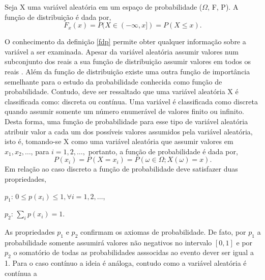   \begin{defin}
	  Seja X uma vari\'{a}vel aleat\'{o}ria
	  em um espa\c{c}o de probabilidade ($\Omega$, F, P). A fun\c{c}\~{a}o de distribui\c{c}\~{a}o \'{e} dada por,
  	\begin{equation*} 
		F_{x} (x) = P( X \in (-\infty, x]) = P(X \leq x). 
	\end{equation*} \label{fdp} 
  \end{defin}
O conhecimento da defini\c c\~ao \ref{fdp} permite obter qualquer informa\c{c}\~{a}o sobre a vari\'{a}vel a ser examinada.
Apesar da vari\'{a}vel aleat\'oria assumir valores num subconjunto dos reais a sua fun\c{c}\~{a}o de
distribui\c{c}\~{a}o assumir valores em todos os reais \cite{magalhaes}. Al\'{e}m da fun\c{c}\~{a}o de
distribui\c{c}\~{a}o existe uma outra fun\c{c}\~{a}o de import\^ancia semelhante para o estudo da
probabilidade conhecida como fun\c{c}\~{a}o de probabilidade.  Contudo, deve ser ressaltado que uma
vari\'{a}vel aleat\'{o}ria X \'{e} classificada como: discreta ou cont\'{i}nua. Uma vari\'{a}vel \'{e}
classificada como discreta quando assumir somente um n\'{u}mero enumer\'{a}vel de valores finito ou infinito.
Desta forma, uma fun\c c\~ao de probabilidade para esse tipo de vari\'avel aleat\'oria 
atribuir valor a cada um dos poss\'{i}veis valores assumidos pela vari\'{a}vel
aleat\'{o}ria, isto \'e, tomando-se X como uma vari\'{a}vel aleat\'{o}ria que assumir valores em $x_1, x_2,
\dots $, para $i = 1,2, \dots,$ portanto, a fun\c c\~ao de probabilidade \'e dada por, 
	\begin{equation*}
		P(x_i) = P(X = x_i) = P(\omega \in \Omega; X(\omega) = x). 
	\end{equation*} Em rela\c c\~ao ao caso
discreto a fun\c{c}\~{a}o de probabilidade deve satisfazer duas propriedades, 
	\begin{description}
		\centering
	  	\item $p_1$: $ 0 \leq p(x_i) \leq 1, \forall i = 1,2, \dots $, 
		\item $p_2$: $ \sum\limits_{i}^{} p(x_i)= 1. \qquad \qquad \quad \ \ \ \ $ 
  	\end{description} 
As propriedades $p_1$ e $p_2$ confirmam os
axiomas de probabilidade.  De fato, por $p_1$ a probabilidade somente assumir\'{a} valores n\~{a}o negativos
no intervalo $[0,1]$ e por $p_2$ o somat\'{o}rio de todas as probabilidades asssocidas ao evento dever ser
igual a 1.  Para o caso cont\'{i}nuo a ideia \'e an\'aloga, contudo como a vari\'avel aleat\'oria \'e cont\'inua a
